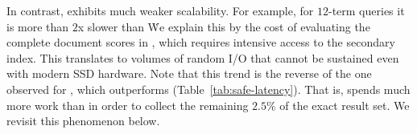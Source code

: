 {{


In contrast, \pRA\/ exhibits much weaker scalability. For example, for $12$-term queries it is more than $2$x slower than \alg\. 
We explain this by the cost of evaluating the complete 
document scores in \pRA, which requires intensive access to the secondary index. This translates to volumes of random 
I/O that cannot be sustained even with modern SSD hardware. Note that this trend is the reverse of the one observed for \pRA\ex, 
which outperforms \alg\ex\/ (Table~\ref{tab:safe-latency}). That is, \alg\/ spends much more work than \pRA\/ 
in order to collect the remaining $2.5\%$ of the exact result set. We revisit this phenomenon  below. 


}}
